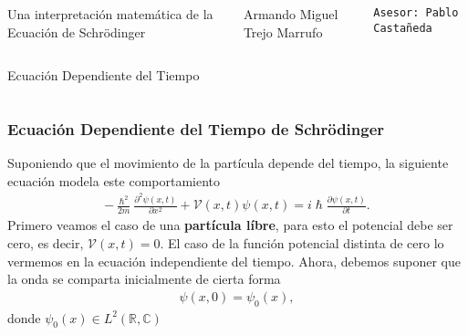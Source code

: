 \documentclass[aspectratio=1610]{beamer}
\newcommand*{\field}[1]{\mathbb{#1}}
\begin{document}
\begin{frame}

  \vspace{0.02\textheight}
  
\begin{columns}[]
\column{37em}
\Large{\centerline{Una interpretación matemática de la Ecuación de Schrödinger}}

\vspace{0.1\textheight}

\vspace{0.1\textheight}

\small{\centerline{Armando Miguel Trejo Marrufo}}
\scriptsize{\centerline{\tt Asesor: Pablo Castañeda}}
\scriptsize{\centerline{}}
\end{columns}
\end{frame}


\begin{frame}
\begin{columns}
\column{37em}
\vspace{1cm}
\Huge{\centerline{Ecuación Dependiente del Tiempo}}
\end{columns}
\end{frame}


\begin{frame}
\frametitle{Ecuación Dependiente del Tiempo de Schrödinger}

Suponiendo que el movimiento de la partícula depende del tiempo, la siguiente ecuación modela este comportamiento
\begin{align}
    -\frac{\hslash^2}{2m}\frac{\partial^2\psi(x,t)}{\partial x^2} + \mathcal{V}(x,t)\psi(x,t) = i\hslash\frac{\partial\psi(x,t)}{\partial t}.
    \label{eq:ECDepTiemp}
\end{align}
Primero veamos el caso de una \textbf{partícula líbre}, para esto el potencial debe ser cero, es decir, $\mathcal{V}(x,t) = 0$. El caso de la función potencial distinta de cero lo vermemos en la ecuación independiente del tiempo. Ahora, debemos suponer que la onda se comparta inicialmente de cierta forma 
\begin{align*}
    \psi(x,0) = \psi_{0}(x),
\end{align*}
donde $\psi_{0}(x) \in L^{2}(\field{R},\field{C})$

\begin{columns}
\column{37em}
\end{columns}
\end{frame}
\end{document}
